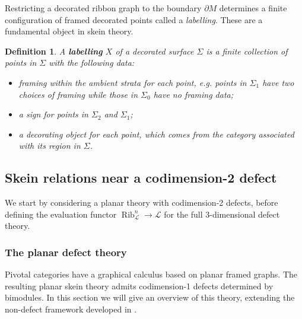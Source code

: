 \documentclass[a4paper]{article}
\numberwithin{equation}{section}
\newtheorem{definition}[counter]{Definition}
\newcommand{\1}{{\mathrm{1}\mkern-4mu{\mathchoice{}{}{\mskip-0.5mu}{\mskip-1mu}}\mathrm{l}}}
\renewcommand{\L}{\mathcal{L}}
\DeclareMathOperator{\Rib}{Rib}
\begin{document}
Restricting a decorated ribbon graph to the boundary $\partial M$ determines a finite configuration of framed decorated points called a \emph{labelling}.
These are a fundamental object in skein theory.

\begin{definition}\label{def:labelling}
  A \emph{\bf labelling} $X$ of a decorated surface $\Sigma$ is a finite collection of points in $\Sigma$ with the following data:\\[-2em]
  \begin{itemize}
      \item framing within the ambient strata for each point, e.g. points in $\Sigma_1$ have two choices of framing while those in $\Sigma_0$ have no framing data;
      \item a sign for points in $\Sigma_2$ and $\Sigma_1$;
      \item a decorating object for each point, which comes from the category associated with its region in $\Sigma$.
  \end{itemize}
\end{definition}



\subsection{Skein relations near a codimension-2 defect}\label{sec:evaluation}

We start by considering a planar theory with codimension-2 defects, before defining the evaluation functor $\Rib^n_\L \to \L$ for the full 3-dimensional defect theory.

\subsubsection{The planar defect theory}\label{sec:planar-defect-theory}

Pivotal categories have a graphical calculus based on planar framed graphs. The resulting planar skein theory admits codimension-1 defects determined by bimodules.
In this section we will give an overview of this theory, extending the non-defect framework developed in \cite{GPV2012}.
\end{document}
